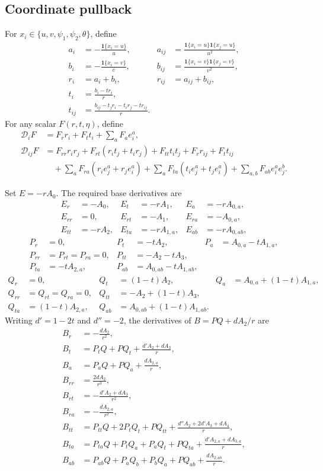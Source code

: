 \documentclass[10pt]{article}
\newcommand{\ind}{\mathbf{1}}
\newcommand{\D}{\mathcal{D}}
\begin{document}
\subsection{Coordinate pullback}

For $x_i\in\{u,v,\psi_1,\psi_2,\theta\}$, define
\begin{align*}
a_i&=-\frac{\ind\{x_i=u\}}{u},
&a_{ij}&=\frac{\ind\{x_i=u\}\ind\{x_j=u\}}{u^2},\\
b_i&=-\frac{\ind\{x_i=v\}}{v},
&b_{ij}&=\frac{\ind\{x_i=v\}\ind\{x_j=v\}}{v^2},\\
r_i&=a_i+b_i,
&r_{ij}&=a_{ij}+b_{ij},\\
t_i&=\frac{b_i-tr_i}{r},\\
t_{ij}&=\frac{b_{ij}-t_jr_i-t_ir_j-tr_{ij}}{r}.
\end{align*}
For any scalar $F(r,t,\eta)$, define
\begin{align*}
\D_iF
&=F_r r_i+F_t t_i+\sum_aF_a e_i^a,\\
\D_{ij}F
&=F_{rr}r_ir_j+F_{rt}(r_it_j+t_ir_j)+F_{tt}t_it_j
 +F_r r_{ij}+F_t t_{ij}\\
&\quad
 +\sum_aF_{ra}(r_ie_j^a+r_je_i^a)
 +\sum_aF_{ta}(t_ie_j^a+t_je_i^a)
 +\sum_{a,b}F_{ab}e_i^ae_j^b.
\end{align*}

Set $E=-rA_0$.  The required base derivatives are
\begin{align*}
E_r&=-A_0,&E_t&=-rA_1,&E_a&=-rA_{0,a},\\
E_{rr}&=0,&E_{rt}&=-A_1,&E_{ra}&=-A_{0,a},\\
E_{tt}&=-rA_2,&E_{ta}&=-rA_{1,a},&E_{ab}&=-rA_{0,ab},
\end{align*}
\begin{align*}
P_r&=0,&P_t&=-tA_2,&P_a&=A_{0,a}-tA_{1,a},\\
P_{rr}&=P_{rt}=P_{ra}=0,
&P_{tt}&=-A_2-tA_3,\\
P_{ta}&=-tA_{2,a},
&P_{ab}&=A_{0,ab}-tA_{1,ab},
\end{align*}
\begin{align*}
Q_r&=0,&Q_t&=(1-t)A_2,&Q_a&=A_{0,a}+(1-t)A_{1,a},\\
Q_{rr}&=Q_{rt}=Q_{ra}=0,
&Q_{tt}&=-A_2+(1-t)A_3,\\
Q_{ta}&=(1-t)A_{2,a},
&Q_{ab}&=A_{0,ab}+(1-t)A_{1,ab}.
\end{align*}
Writing $d'=1-2t$ and $d''=-2$, the derivatives of
$B=PQ+dA_2/r$ are
\begin{align*}
B_r
&=-\frac{dA_2}{r^2},\\
B_t
&=P_tQ+PQ_t+\frac{d'A_2+dA_3}{r},\\
B_a
&=P_aQ+PQ_a+\frac{dA_{2,a}}{r},\\
B_{rr}
&=\frac{2dA_2}{r^3},\\
B_{rt}
&=-\frac{d'A_2+dA_3}{r^2},\\
B_{ra}
&=-\frac{dA_{2,a}}{r^2},\\
B_{tt}
&=P_{tt}Q+2P_tQ_t+PQ_{tt}
 +\frac{d''A_2+2d'A_3+dA_4}{r},\\
B_{ta}
&=P_{ta}Q+P_tQ_a+P_aQ_t+PQ_{ta}
 +\frac{d'A_{2,a}+dA_{3,a}}{r},\\
B_{ab}
&=P_{ab}Q+P_aQ_b+P_bQ_a+PQ_{ab}
 +\frac{dA_{2,ab}}{r}.
\end{align*}
\end{document}
